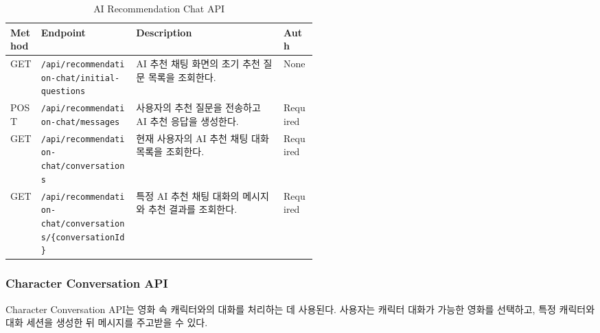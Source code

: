 \documentclass[11pt,a4paper]{article}
\renewcommand{\arraystretch}{1.18}
\begin{document}
\begin{table}[H]
\centering
\footnotesize
\setlength{\tabcolsep}{5pt}
\renewcommand{\arraystretch}{1.28}
\begin{tabularx}{\linewidth}{@{}>{\RaggedRight\arraybackslash}p{0.10\linewidth}>{\RaggedRight\arraybackslash}p{0.31\linewidth}>{\RaggedRight\arraybackslash}X>{\RaggedRight\arraybackslash}p{0.11\linewidth}@{}}
\toprule
\textbf{Method} & \textbf{Endpoint} & \textbf{Description} & \textbf{Auth} \\
\midrule
GET & \texttt{/\allowbreak{}api/\allowbreak{}recommendation-\allowbreak{}chat/\allowbreak{}initial-\allowbreak{}questions} & AI 추천 채팅 화면의 초기 추천 질문 목록을 조회한다. & None \\
POST & \texttt{/\allowbreak{}api/\allowbreak{}recommendation-\allowbreak{}chat/\allowbreak{}messages} & 사용자의 추천 질문을 전송하고 AI 추천 응답을 생성한다. & Required \\
GET & \texttt{/\allowbreak{}api/\allowbreak{}recommendation-\allowbreak{}chat/\allowbreak{}conversations} & 현재 사용자의 AI 추천 채팅 대화 목록을 조회한다. & Required \\
GET & \texttt{/\allowbreak{}api/\allowbreak{}recommendation-\allowbreak{}chat/\allowbreak{}conversations/\allowbreak{}\{\allowbreak{}conversationId\}\allowbreak{}} & 특정 AI 추천 채팅 대화의 메시지와 추천 결과를 조회한다. & Required \\
\bottomrule
\end{tabularx}
\caption{AI Recommendation Chat API}
\end{table}

\hypertarget{character-conversation-api}{%
\subsubsection{Character Conversation API}\label{character-conversation-api}}

Character Conversation API는 영화 속 캐릭터와의 대화를 처리하는 데 사용된다. 사용자는 캐릭터 대화가 가능한 영화를 선택하고, 특정 캐릭터와 대화 세션을 생성한 뒤 메시지를 주고받을 수 있다.
\end{document}
